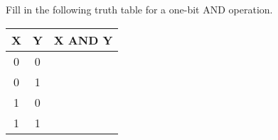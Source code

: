 \documentclass[11pt, letterpaper, includehead]{article}
\begin{document}
\section{}
Fill in the following truth table for a one-bit AND operation.
\renewcommand{\arraystretch}{1.2}
\begin{center}
    \begin{tabular}{  c  c  | c }
        \hline
        X & Y & X AND Y \\
        \hline
        0 & 0           \\
        0 & 1           \\
        1 & 0           \\
        1 & 1           \\
        \hline
    \end{tabular}
\end{center}
\end{document}
